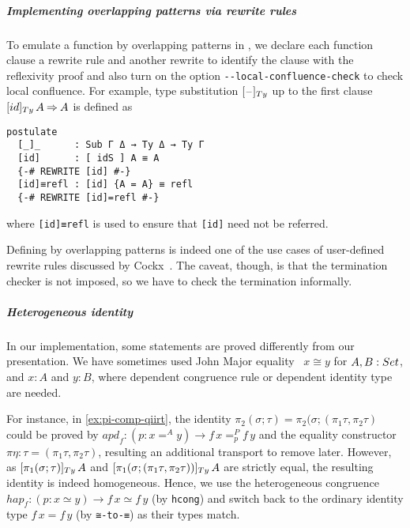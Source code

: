 \documentclass[a4paper,UKenglish,numberwithinsect,cleveref,thm-restate]{lipics-v2021}
\begin{document}
\subparagraph*{Implementing overlapping patterns via rewrite rules}
To emulate a function by overlapping patterns in \Agda, we declare each function clause a rewrite rule \cite{Cockx2020,Cockx2021} and another rewrite to identify the clause with the reflexivity proof and also turn on the option \texttt{-{}-local-confluence-check} to check local confluence.
For example, type substitution $[\blank]_{\Ty}$ up to the first clause $[\idS]_{\Ty}\,A \reduce A$ is defined as
\begin{lstlisting}
postulate
  [_]_      : Sub Γ Δ → Ty Δ → Ty Γ
  [id]      : [ idS ] A ≡ A
  {-# REWRITE [id] #-}
  [id]≡refl : [id] {A = A} ≡ refl
  {-# REWRITE [id]=refl #-}
\end{lstlisting}
where \lstinline|[id]≡refl| is used to ensure that \lstinline|[id]| need not be referred.

Defining by overlapping patterns is indeed one of the use cases of user-defined rewrite rules discussed by Cockx~\cite{Cockx2020}. 
The caveat, though, is that the termination checker is not imposed, so we have to check the termination informally.

\subparagraph*{Heterogeneous identity}
In our implementation, some statements are proved differently from our presentation. 
We have sometimes used John Major equality~\cite{McBride1999} $x \cong y$  for $A, B : \Set$, and $x : A$ and $y : B$, where dependent congruence rule or dependent identity type are needed.

For instance, in \cref{ex:pi-comp-qiirt}, the identity $\pi_2(\sigma ; \tau) = \pi_2(\sigma; (\pi_1 \tau, \pi_2 \tau)$ could be proved by $\mathit{apd}_f \colon (p : x =^A y) \to f\,x =^{P}_{p} f\,y$ and the equality constructor $\pi\eta : \tau = (\pi_1\tau, \pi_2\tau)$, resulting an additional transport to remove later.
However, as $[\pi_1(\sigma; \tau)]_{\Ty}\,A$ and $[\pi_1(\sigma; (\pi_1\tau, \pi_2\tau))]_{\Ty}\,A$ are strictly equal, the resulting identity is indeed homogeneous.
Hence, we use the heterogeneous congruence $\mathit{hap}_f\colon (p : x \simeq y) \to f\,x\simeq f\,y$ (by \lstinline|hcong|) and switch back to the ordinary identity type $f\,x = f\, y$ (by \lstinline|≅-to-≡|) as their types match.
 
\end{document}
